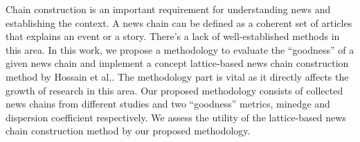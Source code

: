 Chain construction is an important requirement for understanding news and establishing the context. A news chain can be defined as a coherent set of articles that explains an event or a story. There's a lack of well-established methods in this area. In this work, we propose a methodology to evaluate the ``goodness'' of a given news chain and implement a concept lattice-based news chain construction method by Hossain et al.. The methodology part is vital as it directly affects the growth of research in this area. Our proposed methodology consists of collected news chains from different studies and two ``goodness'' metrics, minedge and dispersion coefficient respectively. We assess the utility of the lattice-based news chain construction method by our proposed methodology.
